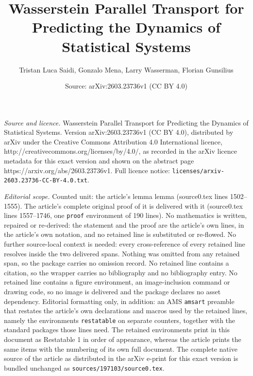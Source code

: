 \documentclass[10pt,a4paper]{amsart}
\title{Wasserstein Parallel Transport for Predicting the Dynamics of Statistical Systems}
\author{Tristan Luca Saidi, Gonzalo Mena, Larry Wasserman, Florian Gunsilius}
\date{Source: arXiv:2603.23736v1 (CC BY 4.0)}
\begin{document}
\maketitle

\noindent\emph{Source and licence.} Wasserstein Parallel Transport for Predicting the Dynamics of Statistical Systems. Version arXiv:2603.23736v1 (CC BY 4.0), distributed by arXiv under the Creative Commons Attribution 4.0 International licence, http://creativecommons.org/licenses/by/4.0/, as recorded in the arXiv licence metadata for this exact version and shown on the abstract page https://arxiv.org/abs/2603.23736v1. Full licence notice: \texttt{licenses/arxiv-2603.23736-CC-BY-4.0.txt}.\par\smallskip

\noindent\textit{Editorial scope.} Counted unit: the article's lemma lemma (source0.tex lines 1502--1555). The article's complete original proof of it is delivered with it (source0.tex lines 1557--1746, one \texttt{proof} environment of 190 lines). No mathematics is written, repaired or re-derived: the statement and the proof are the article's own lines, in the article's own notation, and no retained line is substituted or re-flowed.  No further source-local context is needed: every cross-reference of every retained line resolves inside the two delivered spans.  Nothing was omitted from any retained span, so the package carries no omission record.  No retained line contains a citation, so the wrapper carries no bibliography and no bibliography entry.  No retained line contains a figure environment, an image-inclusion command or drawing code, so no image is delivered and the package declares no asset dependency.  Editorial formatting only, in addition: an AMS \texttt{amsart} preamble that restates the article's own declarations and macros used by the retained lines, namely the environments \texttt{restatable} on separate counters, together with the standard packages those lines need.  The retained environments print in this document as Restatable 1 in order of appearance, whereas the article prints the same items with the numbering of its own full document.  The complete native source of the article as distributed in the arXiv e-print for this exact version is bundled unchanged as \texttt{sources/197103/source0.tex}.
\end{document}
